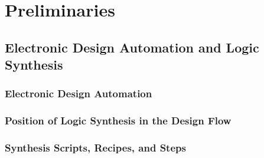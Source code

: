 \section{Preliminaries}
\label{sec:prelim}

\subsection{Electronic Design Automation and Logic Synthesis}
\label{sec:prelim:synthesis}

\subsubsection{Electronic Design Automation}
\label{sec:prelim:synthesis:eda}

\subsubsection{Position of Logic Synthesis in the Design Flow}
\label{sec:prelim:synthesis:flow}

\subsubsection{Synthesis Scripts, Recipes, and Steps}
\label{sec:prelim:synthesis:scripts}
